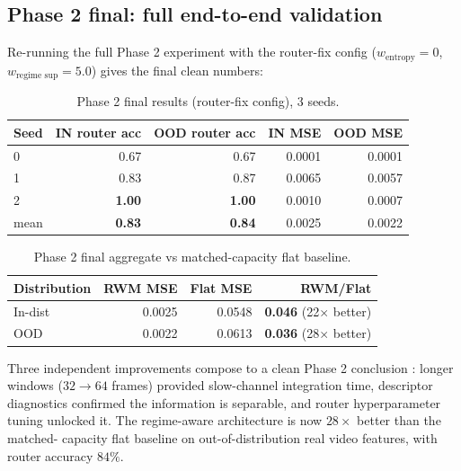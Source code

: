 \documentclass[11pt,a4paper]{article}
\begin{document}
\subsection{Phase 2 final: full end-to-end validation}
\label{sec:rwm-video-final}

Re-running the full Phase 2 experiment with the router-fix config
($w_{\text{entropy}}=0$, $w_{\text{regime sup}}=5.0$) gives the
final clean numbers:

\begin{table}[h]
\centering
\caption{Phase 2 final results (router-fix config), 3 seeds.}
\label{tab:rwm-video-final}
\begin{tabular}{lrrrr}
\toprule
Seed & IN router acc & OOD router acc & IN MSE & OOD MSE \\
\midrule
0 & 0.67 & 0.67 & 0.0001 & 0.0001 \\
1 & 0.83 & 0.87 & 0.0065 & 0.0057 \\
2 & \textbf{1.00} & \textbf{1.00} & 0.0010 & 0.0007 \\
\midrule
mean & \textbf{0.83} & \textbf{0.84} & 0.0025 & 0.0022 \\
\bottomrule
\end{tabular}
\end{table}

\begin{table}[h]
\centering
\caption{Phase 2 final aggregate vs matched-capacity flat baseline.}
\label{tab:rwm-video-summary}
\begin{tabular}{lrrr}
\toprule
Distribution & RWM MSE & Flat MSE & RWM/Flat \\
\midrule
In-dist  & 0.0025 & 0.0548 & \textbf{0.046} (22$\times$ better) \\
OOD      & 0.0022 & 0.0613 & \textbf{0.036} (28$\times$ better) \\
\bottomrule
\end{tabular}
\end{table}

Three independent improvements compose to a clean Phase 2
conclusion : longer windows ($32 \to 64$ frames) provided slow-channel
integration time, descriptor diagnostics confirmed the information is
separable, and router hyperparameter tuning unlocked it. The
regime-aware architecture is now $28\times$ better than the matched-
capacity flat baseline on out-of-distribution real video features,
with router accuracy $84\%$.
\end{document}
